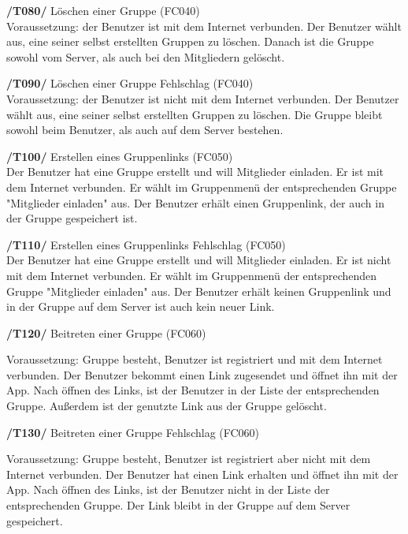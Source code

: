 \textbf{/T080/} Löschen einer Gruppe (FC040)\\
Voraussetzung: der Benutzer ist mit dem Internet verbunden.
Der Benutzer wählt aus, eine seiner selbst erstellten Gruppen zu löschen.
Danach ist die Gruppe sowohl vom Server, als auch bei den Mitgliedern gelöscht.
\begin{itemize}

\textbf{/T090/} Löschen einer Gruppe Fehlschlag (FC040)\\
Voraussetzung: der Benutzer ist nicht mit dem Internet verbunden.
Der Benutzer wählt aus, eine seiner selbst erstellten Gruppen zu löschen.
Die Gruppe bleibt sowohl beim Benutzer, als auch auf dem Server bestehen.
\begin{itemize}

\textbf{/T100/} Erstellen eines Gruppenlinks (FC050)\\
Der Benutzer hat eine Gruppe erstellt und will Mitglieder einladen.
Er ist mit dem Internet verbunden.
Er wählt im Gruppenmenü der entsprechenden Gruppe "Mitglieder einladen" aus.
Der Benutzer erhält einen Gruppenlink, der auch in der Gruppe gespeichert ist.
\begin{itemize}

\textbf{/T110/} Erstellen eines Gruppenlinks Fehlschlag (FC050)\\
Der Benutzer hat eine Gruppe erstellt und will Mitglieder einladen.
Er ist nicht mit dem Internet verbunden.
Er wählt im Gruppenmenü der entsprechenden Gruppe "Mitglieder einladen" aus.
Der Benutzer erhält keinen Gruppenlink und in der Gruppe auf dem Server ist auch kein neuer Link.
\begin{itemize}

\textbf{/T120/} Beitreten einer Gruppe (FC060)\\
\begin{itemize}
Voraussetzung: Gruppe besteht, Benutzer ist registriert und mit dem Internet verbunden.
Der Benutzer bekommt einen Link zugesendet und öffnet ihn mit der App.
Nach öffnen des Links, ist der Benutzer in der Liste der entsprechenden Gruppe.
Außerdem ist der genutzte Link aus der Gruppe gelöscht.
\end{itemize}

\textbf{/T130/} Beitreten einer Gruppe Fehlschlag (FC060)\\
\begin{itemize}
Voraussetzung: Gruppe besteht, Benutzer ist registriert aber nicht mit dem Internet verbunden.
Der Benutzer hat einen Link erhalten und öffnet ihn mit der App.
Nach öffnen des Links, ist der Benutzer nicht in der Liste der entsprechenden Gruppe.
Der Link bleibt in der Gruppe auf dem Server gespeichert.
\end{itemize}


\end{itemize}
\end{itemize}
\end{itemize}
\end{itemize}
